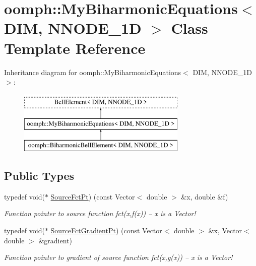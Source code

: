 \hypertarget{classoomph_1_1MyBiharmonicEquations}{}\section{oomph\+:\+:My\+Biharmonic\+Equations$<$ D\+IM, N\+N\+O\+D\+E\+\_\+1D $>$ Class Template Reference}
\label{classoomph_1_1MyBiharmonicEquations}
Inheritance diagram for oomph\+:\+:My\+Biharmonic\+Equations$<$ D\+IM, N\+N\+O\+D\+E\+\_\+1D $>$\+:\begin{figure}[H]
\begin{center}
\leavevmode
\includegraphics[height=3.000000cm]{classoomph_1_1MyBiharmonicEquations}
\end{center}
\end{figure}
\subsection*{Public Types}
\begin{DoxyCompactItemize}
\item 
typedef void($\ast$ \hyperlink{classoomph_1_1MyBiharmonicEquations_a17bd58054c66229016eb1c52eab36bc1}{Source\+Fct\+Pt}) (const Vector$<$ double $>$ \&x, double \&f)
\begin{DoxyCompactList}\small\item\em Function pointer to source function fct(x,f(x)) -- x is a Vector! \end{DoxyCompactList}\item 
typedef void($\ast$ \hyperlink{classoomph_1_1MyBiharmonicEquations_af007c03701e888fed7375cb4537f0046}{Source\+Fct\+Gradient\+Pt}) (const Vector$<$ double $>$ \&x, Vector$<$ double $>$ \&gradient)
\begin{DoxyCompactList}\small\item\em Function pointer to gradient of source function fct(x,g(x)) -- x is a Vector! \end{DoxyCompactList}\end{DoxyCompactItemize}
